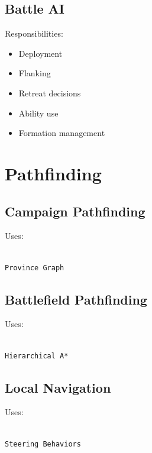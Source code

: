 \documentclass[11pt,a4paper]{article}
\begin{document}
\subsection{Battle AI}

Responsibilities:

\begin{itemize}

    \item Deployment

    \item Flanking

    \item Retreat decisions

    \item Ability use

    \item Formation management

\end{itemize}

\section{Pathfinding}

\subsection{Campaign Pathfinding}

Uses:

\begin{verbatim}

Province Graph

\end{verbatim}

\subsection{Battlefield Pathfinding}

Uses:

\begin{verbatim}

Hierarchical A*

\end{verbatim}

\subsection{Local Navigation}

Uses:

\begin{verbatim}

Steering Behaviors

\end{verbatim}
\end{document}
